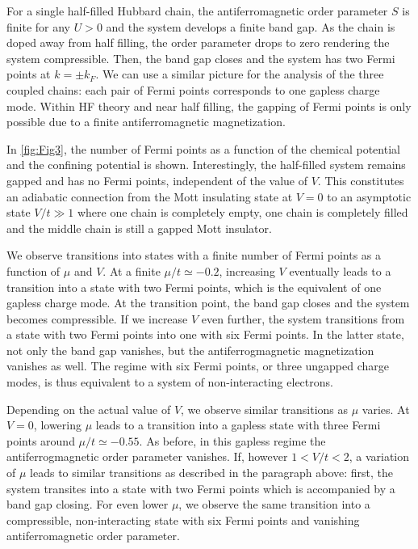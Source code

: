 \documentclass[twocolumn, prl, aps, floatfix, superscriptaddress, longbibliography]{revtex4-1}
\begin{document}
For a single half-filled Hubbard chain, the antiferromagnetic order parameter $S$ is finite for any $U>0$ and the system develops a finite band gap. As the chain is doped away from half filling, the order parameter drops to zero rendering the system compressible. Then, the band gap closes and the system has two Fermi points at $k = \pm k_F$. We can use a similar picture for the analysis of the three coupled chains: each pair of Fermi points corresponds to one gapless charge mode. Within HF theory and near half filling, the gapping of Fermi points is only possible due to a finite antiferromagnetic magnetization.

In \autoref{fig:Fig3}, the number of Fermi points as a function of the chemical potential and the confining potential is shown. Interestingly, the half-filled system remains gapped and has no Fermi points, independent of the  value of $V$. This constitutes an adiabatic connection from the Mott insulating state at $V=0$ to an asymptotic state $V/t \gg 1$ where one chain is completely empty, one chain is completely filled and the middle chain is still a gapped Mott insulator.

We observe transitions into states with a finite number of Fermi points as a function of $\mu$ and $V$. At a finite $\mu/t \simeq -0.2$, increasing $V$ eventually leads to a transition into a state with two Fermi points, which is the equivalent of one gapless charge mode. At the transition point, the band gap closes and the system becomes compressible. If we increase $V$ even further, the system transitions from a state with two Fermi points into one with six Fermi points. In the latter state, not only the band gap vanishes, but the antiferrogmagnetic magnetization vanishes as well. The regime with six Fermi points, or three ungapped charge modes, is thus equivalent to a system of non-interacting electrons.

Depending on the actual value of $V$, we observe similar transitions as $\mu$ varies. At  $V=0$, lowering $\mu$ leads to a transition into a gapless state with three Fermi points around $\mu/t \simeq -0.55$. As before, in this gapless regime  the antiferrogmagnetic order parameter vanishes. If, however $1<V/t<2$, a variation of $\mu$ leads to similar transitions as described in the paragraph above: first, the system transites into a state with two Fermi points which is accompanied by a band gap closing. For even lower $\mu$, we observe the same transition into a compressible, non-interacting state with six Fermi points and vanishing antiferromagnetic order parameter. 
\end{document}
